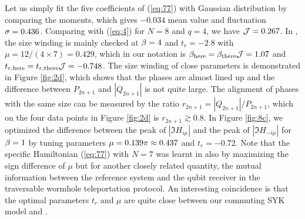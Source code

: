 \documentclass[11pt]{article}
\renewcommand{\>}{\rangle}
\newcommand{\<}{\langle}
\begin{document}
Let us simply fit the five coefficients of (\ref{eq:77}) with Gaussian
distribution by comparing the moments, which gives $-0.034$ mean
value and fluctuation $\sigma=0.436$. Comparing with (\ref{eq:4}) for $N=8$ and
$q=4$, we have $\mathcal{J}=0.267$. In \cite{Jafferis:2022crx} , the size winding is
mainly checked at $\beta=4$ and $t_{r}=-2.8$ with $\mu=12/(4\times7)=0.429$,
which in our notation is $\beta_{\text{\text{here}}}=\beta_{\text{there}}\mathcal{J}=1.07$
and $t_{r,\text{here}}=t_{r,\text{there}}\mathcal{J}=-0.748$. The size winding
of close parameters is demonstrated in Figure \ref{fig:2d}, which
shows that the phases are almost lined up and the difference between
$P_{2n+1}$ and $|Q_{2n+1}|$ is not quite large. The alignment of
phases with the same size can be measured by the ratio $r_{2n+1}=|Q_{2n+1}|/P_{2n+1}$,
which on the four data points in Figure \ref{fig:2d} is $r_{2n+1}\gtrsim0.8$.
In Figure \ref{fig:8c}, we optimized the difference between the peak
of $|\Im H_{i\mu}|$ and the peak of $|\Im H_{-i\mu}|$ for $\beta=1$
by tuning parameters $\mu=0.139\pi\approx0.437$ and $t_{r}=-0.72$.
Note that the specific Hamiltonian (\ref{eq:77}) with $N=7$ was
learnt in \cite{Jafferis:2022crx}  also by maximizing the sign difference of $\mu$
but for another closely related quantity, the mutual information between
the reference system and the qubit receiver in the traversable wormhole
teleportation protocol. An interesting coincidence is that the optimal
parameters $t_{r}$ and $\mu$ are quite close between our commuting
SYK model and \cite{Jafferis:2022crx}. 
\end{document}
